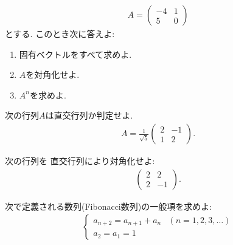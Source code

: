 \begin{quiz}
  \label{quiz:6:4}
  \begin{align*}
    A=\begin{pmatrix}-4&1\\5&0\end{pmatrix}
  \end{align*}
  とする.
  このとき次に答えよ:
  \begin{enumerate}
  \item 固有ベクトルをすべて求めよ.
  \item $A$を対角化せよ.
  \item $A^n$を求めよ.
  \end{enumerate}
\end{quiz}

\begin{quiz}
  \label{quiz:6:5}
  次の行列$A$は直交行列か判定せよ. 
  \begin{align*}
   A=\frac{1}{\sqrt{5}}
    \begin{pmatrix}
      2&-1\\
      1&2
    \end{pmatrix}.
  \end{align*}
\end{quiz}

\begin{quiz}
  \label{quiz:6:6}
  次の行列を
  直交行列により対角化せよ:
  \begin{align*}
    \begin{pmatrix}
      2&2\\2&-1
    \end{pmatrix}.
  \end{align*}
\end{quiz}


\begin{quiz}
  次で定義される数列(Fibonacci数列)の一般項を求めよ:
  \begin{align*}
    \begin{cases}
      a_{n+2}=a_{n+1}+a_n&(n=1,2,3,\ldots)\\
      a_{2}=a_{1}=1
    \end{cases}
  \end{align*}
\end{quiz}

\endinput
\chapter{補遺}
